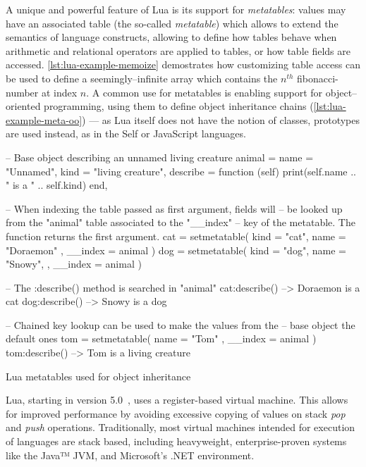 A unique and powerful feature of Lua is its support for \emph{metatables}:
values may have an associated table (the so-called \emph{metatable}) which
allows to extend the semantics of language constructs, allowing to define how
tables behave when arithmetic and relational operators are applied to tables,
or how table fields are accessed. \autoref{lst:lua-example-memoize}
demostrates how customizing table access can be used to define a
seemingly--infinite array which contains the $n^{th}$ \gls{fibonacci-number}
at index $n$. A common use for metatables is enabling support for
object--oriented programming, using them to define object inheritance chains
(\autoref{lst:lua-example-meta-oo}) --- as Lua itself does not have the
notion of classes, prototypes are used instead, as in the Self or JavaScript
languages.

\begin{listing}[htH]
  \begin{luacode}
    -- Base object describing an unnamed living creature
    animal = {
      name = "Unnamed",
      kind = "living creature",
      describe = function (self)
        print(self.name .. " is a " .. self.kind)
      end,
    }

    -- When indexing the table passed as first argument, fields will
    -- be looked up from the "animal" table associated to the "__index"
    -- key of the metatable. The function returns the first argument.
    cat = setmetatable({ kind = "cat", name = "Doraemon" },
                       { __index = animal })
    dog = setmetatable({ kind = "dog", name = "Snowy", },
                       { __index = animal })

    -- The :describe() method is searched in "animal"
    cat:describe()  --> Doraemon is a cat
    dog:describe()  --> Snowy is a dog

    -- Chained key lookup can be used to make the values from the
    -- base object the default ones
    tom = setmetatable({ name = "Tom" }, { __index = animal  })
    tom:describe()  --> Tom is a living creature
  \end{luacode}
  \caption{Lua metatables used for object inheritance}
  \label{lst:lua-example-meta-oo}
\end{listing}

Lua, starting in version 5.0~\cite{lua50-impl}, uses a register-based virtual
machine. This allows for improved performance by avoiding excessive copying of
values on stack \emph{pop} and \emph{push} operations. Traditionally, most
virtual machines intended for execution of languages are stack based,
including heavyweight, enterprise-proven systems like the Java™ JVM, and
Microsoft's .NET environment.


